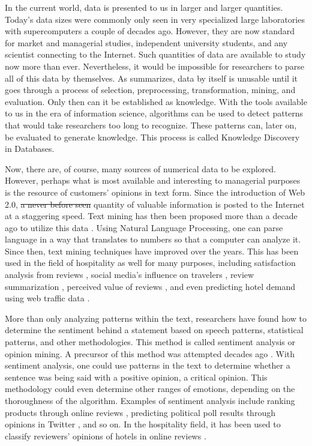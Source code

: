 \documentclass[smallextended,natbib]{svjour3}       %
\providecommand{\DIFadd}[1]{{\protect\color{blue}\uwave{#1}}} %
\providecommand{\DIFdel}[1]{{\protect\color{red}\sout{#1}}}                      %
\providecommand{\DIFaddbegin}{} %
\providecommand{\DIFaddend}{} %
\providecommand{\DIFdelbegin}{} %
\providecommand{\DIFdelend}{} %
\newcommand{\DIFscaledelfig}{0.5}
\newlength{\DIFdelgraphicswidth} %
\newlength{\DIFdelgraphicsheight} %
\newcommand{\DIFaddincludegraphics}[2][]{{\color{blue}\fbox{\DIFOincludegraphics[#1]{#2}}}} %
\newcommand{\DIFdelincludegraphics}[2][]{%
\sbox{\DIFdelgraphicsbox}{\DIFOincludegraphics[#1]{#2}}%
\settoboxwidth{\DIFdelgraphicswidth}{\DIFdelgraphicsbox} %
\settoboxtotalheight{\DIFdelgraphicsheight}{\DIFdelgraphicsbox} %
\scalebox{\DIFscaledelfig}{%
\parbox[b]{\DIFdelgraphicswidth}{\usebox{\DIFdelgraphicsbox}\\[-\baselineskip] \rule{\DIFdelgraphicswidth}{0em}}\llap{\resizebox{\DIFdelgraphicswidth}{\DIFdelgraphicsheight}{%
\setlength{\unitlength}{\DIFdelgraphicswidth}%
\begin{picture}(1,1)%
\thicklines\linethickness{2pt} %
{\color[rgb]{1,0,0}\put(0,0){\framebox(1,1){}}}%
{\color[rgb]{1,0,0}\put(0,0){\line( 1,1){1}}}%
{\color[rgb]{1,0,0}\put(0,1){\line(1,-1){1}}}%
\end{picture}%
}\hspace*{3pt}}} %
} %
\DeclareRobustCommand{\DIFaddbegin}{\DIFOaddbegin \let\includegraphics\DIFaddincludegraphics} %
\DeclareRobustCommand{\DIFaddend}{\DIFOaddend \let\includegraphics\DIFOincludegraphics} %
\DeclareRobustCommand{\DIFdelbegin}{\DIFOdelbegin \let\includegraphics\DIFdelincludegraphics} %
\DeclareRobustCommand{\DIFdelend}{\DIFOaddend \let\includegraphics\DIFOincludegraphics} %
\begin{document}
    In the current world, data is presented to us in larger and larger quantities. Today's data sizes were commonly only seen in very specialized large laboratories with supercomputers a couple of decades ago. However, they are now standard for market and managerial studies, independent university students, and any scientist connecting to the Internet. Such quantities of data are available to study now more than ever. Nevertheless, it would be impossible for researchers to parse all of this data by themselves. As \cite{fayyad1996data} summarizes, data by itself is unusable until it goes through a process of selection, preprocessing, transformation, mining, and evaluation. Only then can it be established as knowledge. With the tools available to us in the era of information science, algorithms can be used to detect patterns that would take researchers too long to recognize. These patterns can, later on, be evaluated to generate knowledge. This process is called Knowledge Discovery in Databases. 

    Now, there are, of course, many sources of numerical data to be explored.  However, perhaps what is most available and interesting to managerial purposes is the resource of customers' opinions in text form. Since the introduction of Web 2.0, \DIFdelbegin \DIFdel{a never before seen }\DIFdelend \DIFaddbegin \DIFadd{an unprecedented }\DIFaddend quantity of valuable information is posted to the Internet at a staggering speed. Text mining has then been proposed more than a decade ago to utilize this data \cite[e.g.][]{rajman1998text,nahm2002text}. Using Natural Language Processing, one can parse language in a way that translates to numbers so that a computer can analyze it. Since then, text mining techniques have improved over the years. This has been used in the field of hospitality as well for many purposes, including satisfaction analysis from reviews \cite[e.g][]{berezina2016, xu2016, xiang2015, hargreaves2015, balbi2018}, social media's influence on travelers \cite[e.g.][]{xiang2010}, review summarization \cite[e.g.][]{hu2017436}, perceived value of reviews \cite[e.g][]{FANG2016498}, and even predicting hotel demand using web traffic data \cite[e.g][]{yang2014}.

    More than only analyzing patterns within the text, researchers have found how to determine the sentiment behind a statement based on speech patterns, statistical patterns, and other methodologies. This method is called sentiment analysis or opinion mining. A precursor of this method was attempted decades ago \cite[][]{stone1966general}. With sentiment analysis, one could use patterns in the text to determine whether a sentence was being said with a positive opinion, a critical opinion. This methodology could even determine other ranges of emotions, depending on the thoroughness of the algorithm. Examples of sentiment analysis include ranking products through online reviews \cite[e.g][]{liu2017149, zhang2011}, predicting political poll results through opinions in Twitter \cite[][]{oconnor2010}, and so on. In the hospitality field, it has been used to classify reviewers' opinions of hotels in online reviews \cite[e.g.][]{kim2017362, alsmadi2018}. 
\end{document}

